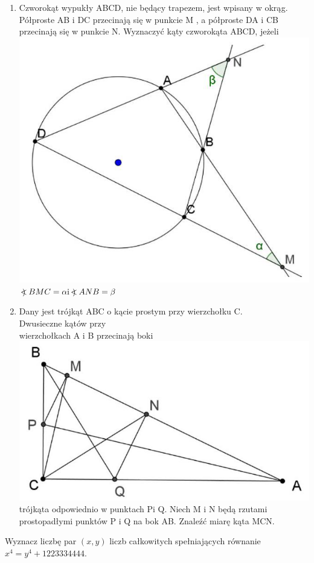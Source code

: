 \documentclass[10pt]{article}
\newcommand\Varangle{\mathop{{<\!\!\!\!\!\text{\small)}}\:}\nolimits}
\begin{document}
\begin{enumerate}
  \item Czworokąt wypukły ABCD, nie będący trapezem, jest wpisany w okrąg. Półproste AB i DC przecinają się w punkcie M , a półproste DA i CB przecinają się w punkcie N. Wyznaczyć kąty czworokąta ABCD, jeżeli\\
\includegraphics[max width=\textwidth, center]{2024_11_21_541d3b47acfc0b787715g-1(1)}\\
\(\Varangle B M C=\alpha \mathrm{i} \Varangle A N B=\beta\)
  \item Dany jest trójkąt ABC o kącie prostym przy wierzchołku C.\\
Dwusieczne kątów przy\\
wierzchołkach A i B przecinają boki\\
\includegraphics[max width=\textwidth, center]{2024_11_21_541d3b47acfc0b787715g-1}\\
trójkąta odpowiednio w punktach Pi Q. Niech M i N będą rzutami prostopadłymi punktów P i Q na bok AB. Znaleźć miarę kąta MCN.
\end{enumerate}

Wyznacz liczbę par \((x, y)\) liczb całkowitych spełniających równanie \(x^{4}=y^{4}+1223334444\).
\end{document}
